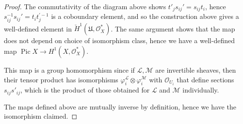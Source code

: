 \documentclass[10pt]{article}
\theoremstyle{definition}
\theoremstyle{remark}
\numberwithin{equation}{section}
\numberwithin{figure}{subsubsection}
\DeclareMathOperator{\Pic}{Pic}
\newcommand{\LL}{\mathscr{L}}
\newcommand{\MM}{\mathscr{M}}
\newcommand{\OO}{\mathcal{O}}
\begin{document}
\begin{proof}
  The commutativity of the diagram above shows $t'_js_{ij}' = s_{ij}t_i$, hence
  $s_{ij}^{-1}s_{ij}' = t_it_j^{\prime-1}$ is a coboundary element, and so the
  construction above gives a well-defined element in
  $\check{H}^1(\mathfrak{U},\OO_X^*)$. The same argument shows that the map does
  not depend on choice of isomorphism class, hence we have a well-defined map
  $\Pic X \to H^1(X,\OO_X^*)$.
  \par This map is a group homomorphism since if $\LL,\MM$ are
  invertible sheaves, then their tensor product has isomorphisms $\varphi_i^\LL
  \otimes \varphi_i^\MM$ with $\OO_{U_i}$ that define sections
  $s_{ij}s'_{ij}$, which is the product of those obtained for $\LL$ and $\MM$
  individually.
  \par The maps defined above are mutually inverse by definition, hence we have
  the isomorphism claimed.
\end{proof}
\end{document}
